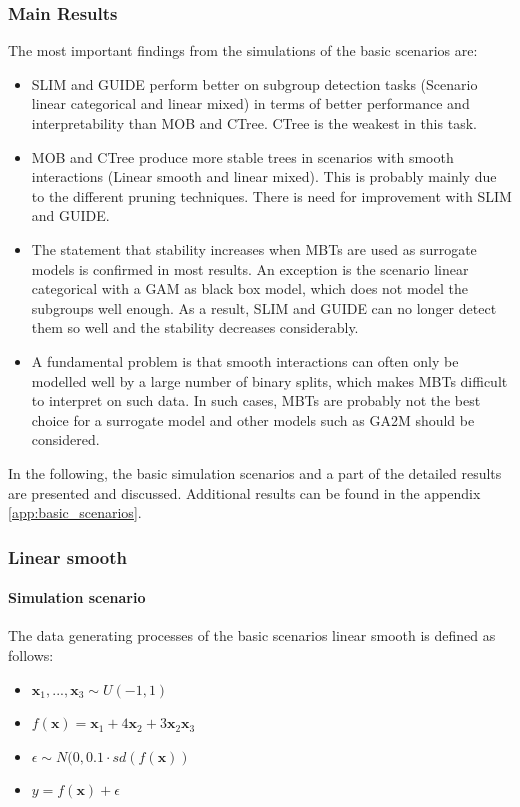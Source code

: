 \subsubsection{Main Results}
The most important findings from the simulations of the basic scenarios are:
\begin{itemize}
    \item SLIM and GUIDE perform better on subgroup detection tasks (Scenario linear categorical and linear mixed) in terms of better performance and interpretability than MOB and CTree. CTree is the weakest in this task.
    \item MOB and CTree produce more stable trees in scenarios with smooth interactions (Linear smooth and linear mixed). This is probably mainly due to the different pruning techniques. There is need for improvement with SLIM and GUIDE.
    \item The statement that stability increases when MBTs are used as surrogate models is confirmed in most results. An exception is the scenario linear categorical with a GAM as black box model, which does not model the subgroups well enough. As a result, SLIM and GUIDE can no longer detect them so well and the stability decreases considerably.
    \item A fundamental problem is that smooth interactions can often only be modelled well by a large number of binary splits, which makes MBTs difficult to interpret on such data. In such cases, MBTs are probably not the best choice for a surrogate model and other models such as GA2M \citep{Lou.2013} should be considered.

\end{itemize}

In the following, the basic simulation scenarios and a part of the detailed  results are presented and discussed. Additional results can be found in the appendix \ref{app:basic_scenarios}.
\subsubsection{Linear smooth} 

\paragraph{Simulation scenario}
The data generating processes of the basic scenarios linear smooth is defined as follows:

\begin{itemize}
    \item $\textbf{x}_1,..., \textbf{x}_{3} \sim U(-1,1)$
    \item $ f(\textbf{x}) = \textbf{x}_1 + 4   \textbf{x}_2 + 3   \textbf{x}_2   \textbf{x}_3 $
    \item $\epsilon \sim N(0, 0.1 \cdot sd(f(\textbf{x}))$
    \item $y = f(\textbf{x}) + \epsilon$
\end{itemize}    

